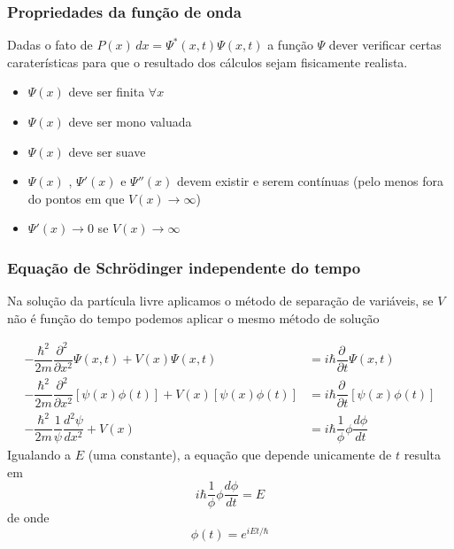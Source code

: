 \documentclass[12pt,brazil,table]{beamer}
\begin{document}

\begin{frame}
  \frametitle{Propriedades da função de onda}
  \fontsize{11pt}{11pt}\selectfont
  
  Dadas o fato de $P(x)\, dx = \Psi ^* (x,t) \Psi (x,t)$ a função $\Psi$ dever verificar certas caraterísticas para que o resultado dos cálculos sejam fisicamente realista.
  
  \begin{itemize}
   \item $\Psi (x)$ deve ser finita $\forall x$
   \item $\Psi (x)$ deve ser mono valuada
   \item $\Psi (x)$ deve ser suave
   \item $\Psi (x)$ , $\Psi' (x)$ e $\Psi'' (x)$ devem existir e serem contínuas (pelo menos fora do pontos em que $V(x) \to \infty$)
   \item $\Psi' (x) \to 0$  se $V(x) \to \infty$
  \end{itemize}

\end{frame}




\begin{frame}
  \frametitle{Equação de Schrödinger independente do tempo}
  \fontsize{10pt}{11pt}\selectfont
  
  Na solução da partícula livre aplicamos o método de separação de variáveis, se $V$ não é função do tempo podemos aplicar o mesmo método de solução
  
      \[
        \begin{align*}
          -\dfrac{\hbar^2}{2m}\dfrac{\partial^2\,}{\partial x^2}\Psi(x,t) + V(x) \Psi(x,t) &= i\hbar \dfrac{\partial\,}{\partial t}\Psi(x,t)\\
          -\dfrac{\hbar^2}{2m}\dfrac{\partial^2\,}{\partial x^2}\left[ \psi(x) \phi(t) \right] + V(x) \left[ \psi(x) \phi(t) \right] &= i\hbar \dfrac{\partial\,}{\partial t}\left[ \psi(x) \phi(t) \right]\\
          -\dfrac{\hbar^2}{2m}\dfrac{1}{\psi}\dfrac{d^2\psi}{dx^2} +V(x)&= i\hbar \dfrac{1}{\phi}\phi\dfrac{d\phi}{dt}
        \end{align*}
      \]
      Igualando a $E$ (uma constante), a equação que depende unicamente de $t$ resulta em
      \[
       i\hbar \dfrac{1}{\phi}\phi\dfrac{d\phi}{dt} = E
      \]
      de onde
      \[
       \phi(t) = e^{iEt/\hbar}
      \]
  
\end{frame}
\end{document}
